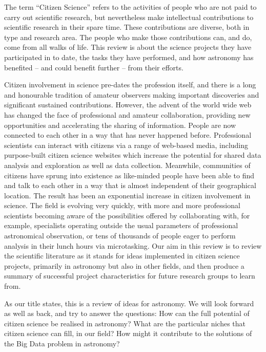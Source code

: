 \documentclass{ar2e}
\begin{document}
The term ``Citizen Science'' refers to the activities of people who are not paid
to carry out scientific research, but nevertheless make intellectual
contributions to scientific research in their spare time. These contributions
are diverse, both in type and research area. The people who make those
contributions can, and do, come from all walks of life. This review is about the
science projects they have participated in to date, the tasks they have
performed, and how astronomy has benefited -- and could benefit further -- from
their efforts.

Citizen involvement in science pre-dates the profession itself, and there is a
long and honourable tradition of amateur observers making important discoveries
and significant sustained contributions. However, the advent of the world wide
web has changed the face of professional and amateur collaboration, providing
new opportunities and accelerating the sharing of information. People are now
connected to each other in a way that has never happened before. Professional
scientists can interact with citizens via a range of web-based media, including
purpose-built citizen science websites which increase the potential for shared
data analysis and exploration as well as data collection. Meanwhile, communities
of citizens have sprung into existence as like-minded people have been able to
find and talk to each other in a way that is almost independent of their
geographical location. The result has been an exponential increase in citizen
involvement in science. The field is evolving very quickly, with more and more
professional scientists becoming aware of the possibilities offered by
collaborating with, for example, specialists operating outside the usual
parameters of professional astronomical observation, or tens of thousands of
people eager to perform analysis in their lunch hours via microtasking.  Our aim
in this review is to review the scientific literature as it stands for ideas
implemented in citizen science projects, primarily in astronomy but also in
other fields, and then produce a summary of successful project characteristics
for future research groups to learn from.

As our title states, this is a review of ideas for astronomy. We will look
forward as well as back, and try to answer the questions: How can the full
potential of citizen science be realised in astronomy? What are the particular
niches that citizen science can fill, in our field? How might it contribute to
the solutions of the Big Data problem in astronomy?
\end{document}
